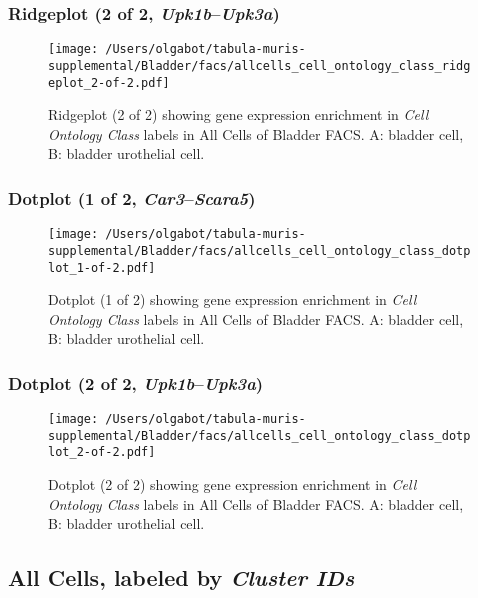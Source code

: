 \clearpage

\subsubsection{Ridgeplot (2 of 2, \emph{Upk1b}--\emph{Upk3a})}
\begin{figure}[h]
\centering
\texttt{[image: /Users/olgabot/tabula-muris-supplemental/Bladder/facs/allcells\_cell\_ontology\_class\_ridgeplot\_2-of-2.pdf]}

\caption{ Ridgeplot (2 of 2)  showing gene expression enrichment in \emph{Cell Ontology Class} labels in All Cells of Bladder FACS. A: bladder cell, B: bladder urothelial cell.}
\end{figure}


\clearpage

\subsubsection{Dotplot (1 of 2, \emph{Car3}--\emph{Scara5})}
\begin{figure}[h]
\centering
\texttt{[image: /Users/olgabot/tabula-muris-supplemental/Bladder/facs/allcells\_cell\_ontology\_class\_dotplot\_1-of-2.pdf]}

\caption{ Dotplot (1 of 2)  showing gene expression enrichment in \emph{Cell Ontology Class} labels in All Cells of Bladder FACS. A: bladder cell, B: bladder urothelial cell.}
\end{figure}


\clearpage

\subsubsection{Dotplot (2 of 2, \emph{Upk1b}--\emph{Upk3a})}
\begin{figure}[h]
\centering
\texttt{[image: /Users/olgabot/tabula-muris-supplemental/Bladder/facs/allcells\_cell\_ontology\_class\_dotplot\_2-of-2.pdf]}

\caption{ Dotplot (2 of 2)  showing gene expression enrichment in \emph{Cell Ontology Class} labels in All Cells of Bladder FACS. A: bladder cell, B: bladder urothelial cell.}
\end{figure}


\clearpage

\subsection{All Cells, labeled by \emph{Cluster IDs}}

